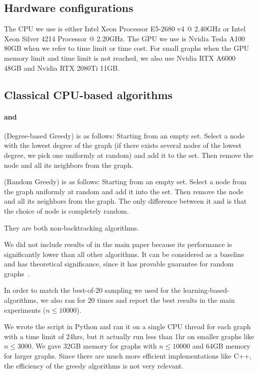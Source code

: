 \subsection{Hardware configurations}
The CPU we use is either Intel Xeon Processor E5-2680 v4 @ 2.40GHz or Intel Xeon Silver 4214 Processor @ 2.20GHz. The GPU we use is Nvidia Tesla A100 80GB when we refer to time limit or time cost. For small graphs when the GPU memory limit and time limit is not reached, we also use Nvidia RTX A6000 48GB and Nvidia RTX 2080Ti 11GB.

\subsection{Classical CPU-based algorithms}
\paragraph{\rangreedy and \deggreedy}
\deggreedy(Degree-based Greedy) is as follows: Starting from an empty set. Select a node with the lowest degree of the graph (if there exists several nodes of the lowest degree, we pick one uniformly at random) and add it to the set. Then remove the node and all its neighbors from the graph. 

\rangreedy(Random Greedy) is as follows: Starting from an empty set. Select a node from the graph uniformly at random and add it into the set. Then remove the node and all its neighbors from the graph. The only difference between it and \deggreedy is that the choice of node is completely random.

They are both non-backtracking algorithms.

We did not include results of \rangreedy in the main paper because its performance is significantly lower than all other algorithms. It can be considered as a baseline and has theoretical significance, since it has provable guarantee for random graphs~\citep{grimmett1975colouring}.

In order to match the best-of-20 sampling we used for the learning-based-algorithms, we also ran \deggreedy for $20$ times and report the best results in the main experiments ($n \leq 10000$).

We wrote the script in Python and ran it on a single CPU thread for each graph with a time limit of 24hrs, but it actually run less than 1hr on smaller graphs like $n \leq 3000$. We gave 32GB memory for graphs with $n\leq 10000$ and 64GB memory for larger graphs. Since there are much more efficient implementations like C++, the efficiency of the greedy algorithms is not very relevant. 

